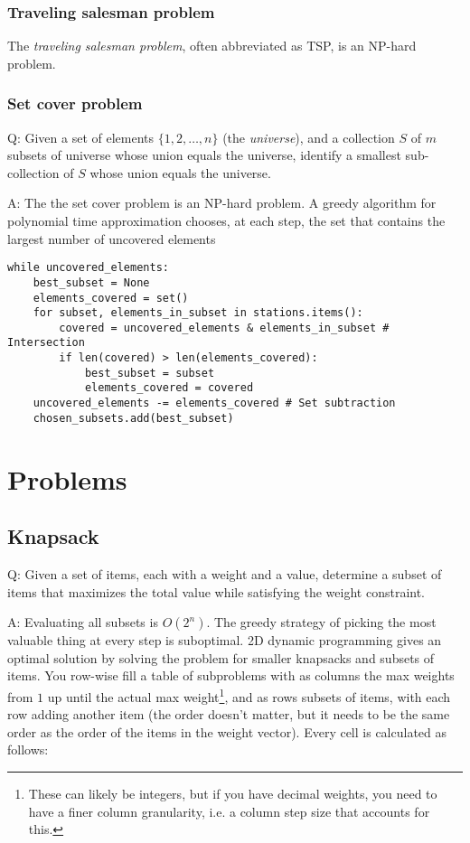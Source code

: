 \documentclass[8pt, table, xcdraw]{article}%
\begin{document}
\subsubsection{Traveling salesman problem}

The \emph{traveling salesman problem}, often abbreviated as TSP, is an NP-hard problem.

\subsubsection{Set cover problem}

Q: Given a set of elements $\{1, 2, …, n\}$ (the \emph{universe}), and a collection $S$ of $m$ subsets of universe whose union equals the universe, identify a smallest sub-collection of $S$ whose union equals the universe.

A: The the set cover problem is an NP-hard problem. A greedy algorithm for polynomial time approximation chooses, at each step, the set that contains the largest number of uncovered elements

\begin{lstlisting}
while uncovered_elements:
    best_subset = None
    elements_covered = set()
    for subset, elements_in_subset in stations.items():
        covered = uncovered_elements & elements_in_subset # Intersection
        if len(covered) > len(elements_covered):
            best_subset = subset
            elements_covered = covered
    uncovered_elements -= elements_covered # Set subtraction
    chosen_subsets.add(best_subset)
\end{lstlisting}

\section{Problems}

\subsection{Knapsack}

Q: Given a set of items, each with a weight and a value, determine a subset of items that maximizes the total value while satisfying the weight constraint.

A: Evaluating all subsets is $O(2^n)$. The greedy strategy of picking the most valuable thing at every step is suboptimal. 2D dynamic programming gives an optimal solution by solving the problem for smaller knapsacks and subsets of items. You row-wise fill a table of subproblems with as columns the max weights from $1$ up until the actual max weight\footnote{These can likely be integers, but if you have decimal weights, you need to have a finer column granularity, i.e. a column step size that accounts for this.}, and as rows subsets of items, with each row adding another item (the order doesn't matter, but it needs to be the same order as the order of the items in the weight vector). Every cell is calculated as follows:
\end{document}

